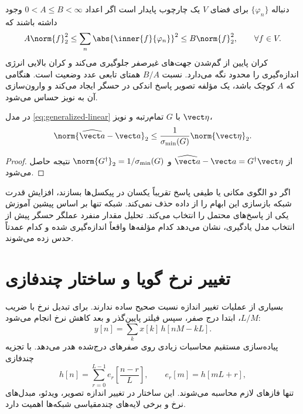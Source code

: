 دنباله \(\{\varphi_n\}\) برای فضای \(V\) یک چارچوب پایدار است اگر اعداد
\(0<A\le B<\infty\) وجود داشته باشند که
\begin{equation}
A\norm{f}_2^2\le
\sum_n\abs{\inner{f}{\varphi_n}}^2
\le B\norm{f}_2^2,
\qquad\forall f\in V.
\label{eq:frame-bounds}
\end{equation}
کران پایین از گم‌شدن جهت‌های غیرصفر جلوگیری می‌کند و کران بالایی انرژی اندازه‌گیری را محدود نگه
می‌دارد. نسبت \(B/A\) همتای تابعی عدد وضعیت است. هنگامی که \(A\) کوچک باشد، یک مؤلفه تصویر
پاسخ اندکی در حسگر ایجاد می‌کند و وارون‌سازی آن به نویز حساس می‌شود.

\begin{proposition}
در مدل \eqref{eq:generalized-linear} با \(G\) تمام‌رتبه و نویز \(\vect\eta\)،
\begin{equation}
\norm{\widehat{\vect a}-\vect a}_2
\le\frac{1}{\sigma_{\min}(G)}\norm{\vect\eta}_2.
\end{equation}
\end{proposition}

\begin{proof}
از \(\widehat{\vect a}-\vect a=G^\dagger\vect\eta\) و
\(\norm{G^\dagger}_2=1/\sigma_{\min}(G)\) نتیجه حاصل می‌شود.
\end{proof}

\begin{keybox}
اگر دو الگوی مکانی یا طیفی پاسخ تقریباً یکسان در پیکسل‌ها بسازند، افزایش قدرت شبکه بازسازی این
ابهام را از داده حذف نمی‌کند. شبکه تنها بر اساس پیشین آموزش یکی از پاسخ‌های محتمل را انتخاب می‌کند.
تحلیل مقدار منفرد عملگر حسگر پیش از انتخاب مدل یادگیری، نشان می‌دهد کدام مؤلفه‌ها واقعاً اندازه‌گیری
شده و کدام عمدتاً حدس زده می‌شوند.
\end{keybox}

\section{تغییر نرخ گویا و ساختار چندفازی}

بسیاری از عملیات تغییر اندازه نسبت صحیح ساده ندارند. برای تبدیل نرخ با ضریب \(L/M\)، ابتدا
درج صفر، سپس فیلتر پایین‌گذر و بعد کاهش نرخ انجام می‌شود:
\begin{equation}
y[n]=\sum_k x[k]\,h[nM-kL].
\label{eq:rational-resampling}
\end{equation}
پیاده‌سازی مستقیم محاسبات زیادی روی صفرهای درج‌شده هدر می‌دهد. با تجزیه چندفازی
\begin{equation}
h[n]=\sum_{r=0}^{L-1}e_r\!\left[\frac{n-r}{L}\right],
\qquad e_r[m]=h[mL+r],
\end{equation}
تنها فازهای لازم محاسبه می‌شوند. این ساختار در تغییر اندازه تصویر، ویدئو، مبدل‌های نرخ و برخی
لایه‌های چندمقیاسی شبکه‌ها اهمیت دارد.

